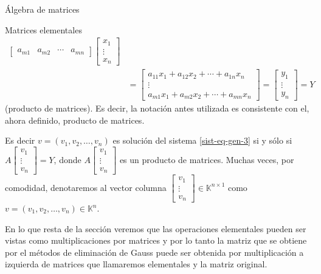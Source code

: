 \begin{chapter}{\'Algebra de matrices}
\begin{section}{Matrices elementales}
\begin{align*}
\begin{bmatrix}
            a_{m1} &a_{m2}&\cdots &a_{mn}\end{bmatrix} \begin{bmatrix} 
            x_1 \\ \vdots \\ x_n 
            \end{bmatrix} \\
            &=
            \begin{bmatrix}
            a_{11}x_1+ a_{12}x_2+ \cdots +a_{1n}x_n \\
            \vdots \\
            a_{m1}x_1 +a_{m2}x_2+\cdots +a_{mn}x_n\end{bmatrix} =
            \begin{bmatrix}
            y_1 \\ \vdots \\ y_n
            \end{bmatrix} = Y
            \end{align*}
            (producto de matrices). Es decir, la notación antes utilizada es consistente con el, ahora definido, producto de matrices.  

            Es decir $v = (v_1, v_2, \ldots, v_n)$ es solución del sistema \eqref{sist-eq-gen-3} si y sólo si $A\begin{bmatrix} 
                v_1 \\ \vdots \\ v_n 
                \end{bmatrix} = Y$, donde $A\begin{bmatrix} 
                    v_1 \\ \vdots \\ v_n 
                    \end{bmatrix}$ es un producto de matrices. Muchas veces, por comodidad, denotaremos al vector columna $\begin{bmatrix} v_1 \\ \vdots \\ v_n  \end{bmatrix} \in \mathbb K^{n\times 1}$ como  $v = (v_1, v_2, \ldots, v_n) \in \mathbb K^n$.
            
            En lo que resta de la sección veremos que las operaciones elementales pueden ser vistas como multiplicaciones por matrices y por lo tanto la matriz que se obtiene por el métodos de eliminación de Gauss puede ser obtenida por multiplicación a izquierda de matrices que llamaremos elementales y la matriz original. 


\end{section}
\end{chapter}
